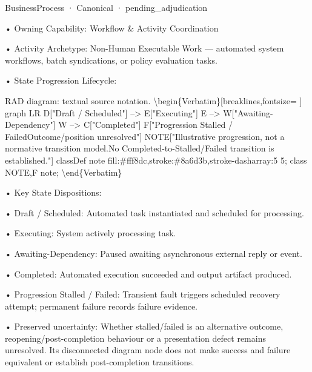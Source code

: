 \label{element:618acdb38fc74952ab360fdde4f7d865}
{\small BusinessProcess · Canonical · pending\_adjudication}\par

•
Owning Capability: Workflow \& Activity Coordination



•
Activity Archetype: Non-Human Executable Work — automated system workflows, batch syndications, or policy evaluation tasks.



•
State Progression Lifecycle:



RAD diagram: textual source notation.
\textbackslash{}begin\{Verbatim\}[breaklines,fontsize=
]
graph LR
    D["Draft / Scheduled"] --> E["Executing"]
    E --> W["Awaiting-Dependency"]
    W --> C["Completed"]
    F["Progression Stalled / Failed\newline{}Outcome/position unresolved"]
    NOTE["Illustrative progression, not a normative transition model.\newline{}No Completed-to-Stalled/Failed transition is established."]
    classDef note fill:\#fff8dc,stroke:\#8a6d3b,stroke-dasharray:5 5;
    class NOTE,F note;
\textbackslash{}end\{Verbatim\}



•
Key State Dispositions:



•
Draft / Scheduled: Automated task instantiated and scheduled for processing.



•
Executing: System actively processing task.



•
Awaiting-Dependency: Paused awaiting asynchronous external reply or event.



•
Completed: Automated execution succeeded and output artifact produced.



•
Progression Stalled / Failed: Transient fault triggers scheduled recovery attempt; permanent failure records failure evidence.



•
Preserved uncertainty: Whether stalled/failed is an alternative outcome, reopening/post-completion behaviour or a presentation defect remains unresolved. Its disconnected diagram node does not make success and failure equivalent or establish post-completion transitions.



